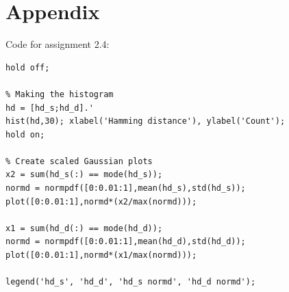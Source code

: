 \documentclass[10pt]{article}
\begin{document}
\section*{Appendix}
Code for assignment 2.4:
\begin{lstlisting}
hold off;

% Making the histogram
hd = [hd_s;hd_d].'
hist(hd,30); xlabel('Hamming distance'), ylabel('Count');
hold on;

% Create scaled Gaussian plots
x2 = sum(hd_s(:) == mode(hd_s));
normd = normpdf([0:0.01:1],mean(hd_s),std(hd_s));
plot([0:0.01:1],normd*(x2/max(normd)));

x1 = sum(hd_d(:) == mode(hd_d));
normd = normpdf([0:0.01:1],mean(hd_d),std(hd_d));
plot([0:0.01:1],normd*(x1/max(normd)));

legend('hd_s', 'hd_d', 'hd_s normd', 'hd_d normd');
\end{lstlisting}
\end{document}
